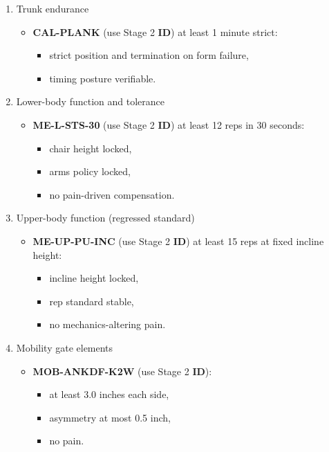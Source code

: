 \documentclass[10pt]{article}
\begin{document}
\begin{enumerate}
\item Trunk endurance

\begin{itemize}
\item \textbf{CAL-PLANK} (use Stage 2 \textbf{ID}) at least 1 minute strict:
  \begin{itemize}
  \item strict position and termination on form failure,
  \item timing posture verifiable.
  \end{itemize}
\end{itemize}

\item Lower-body function and tolerance

\begin{itemize}
\item \textbf{ME-L-STS-30} (use Stage 2 \textbf{ID}) at least 12 reps in 30 seconds:
  \begin{itemize}
  \item chair height locked,
  \item arms policy locked,
  \item no pain-driven compensation.
  \end{itemize}
\end{itemize}

\item Upper-body function (regressed standard)

\begin{itemize}
\item \textbf{ME-UP-PU-INC} (use Stage 2 \textbf{ID}) at least 15 reps at fixed incline height:
  \begin{itemize}
  \item incline height locked,
  \item rep standard stable,
  \item no mechanics-altering pain.
  \end{itemize}
\end{itemize}

\item Mobility gate elements

\begin{itemize}
\item \textbf{MOB-ANKDF-K2W} (use Stage 2 \textbf{ID}):
  \begin{itemize}
  \item at least 3.0 inches each side,
  \item asymmetry at most 0.5 inch,
  \item no pain.
  \end{itemize}


\end{itemize}
\end{enumerate}
\end{document}
